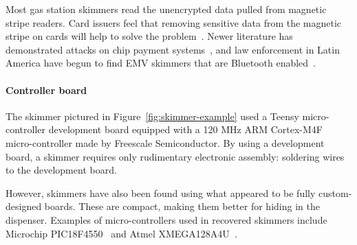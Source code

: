Most gas station skimmers read the unencrypted data pulled from magnetic stripe readers.
%
Card issuers feel that removing sensitive data from the magnetic stripe on cards will help to solve
the problem~\cite{pcidss}.
%
Newer literature has demonstrated attacks on chip payment systems~\cite{bar2005known, bond2014chip}, and
law enforcement in Latin America have begun to find EMV skimmers that are Bluetooth enabled~\cite{krebshimmer,
customshimmer}.

\paragraph{Controller board} The skimmer pictured in Figure~\ref{fig:skimmer-example} used a Teensy micro-controller
development board equipped with a 120 MHz ARM Cortex-M4F micro-controller made by Freescale Semiconductor. By using a
development board, a skimmer requires only rudimentary electronic assembly: soldering wires to the development board.

However, skimmers have also been found using what appeared to be fully custom-designed boards. These are compact,
making them better for hiding in the dispenser. Examples of micro-controllers used in recovered skimmers include
Microchip PIC18F4550~\cite{sparkfunapp} and Atmel XMEGA128A4U~\cite{customshimmer}.




